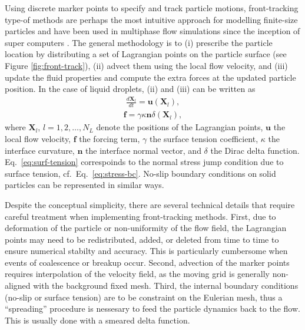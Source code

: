 Using discrete marker points to specify and track particle motions, front-tracking type-of methods are perhaps the most intuitive approach for modelling finite-size particles and have been used in multiphase flow simulations since the inception of super computers \citep{Daly1969, Viecelli_1969, Peskin, Glimm_1982, unverdi_tryggvason_1992a, tryggvason_bunner_esmaeeli_juric_al-rawahi_tauber_han_nas_jan_2001a, Pozrikidis_JCP2001, Muradoglu_Tryggvason_2014}.
The general methodology is to
(i) prescribe the particle location by distributing a set of Lagrangian points on the particle surface (see Figure \ref{fig:front-track}),
(ii) advect them using the local flow velocity, and
(iii) update the fluid properties and compute the extra forces at the updated particle position.
In the case of liquid droplets, (ii) and (iii) can be written as
\begin{equation} \label{eq:lagrangian}
 \begin{aligned}
   \frac{d \bm{X}_l}{dt} = \bm{u}(\bm{X}_l),
 \end{aligned}
\end{equation}
\begin{equation} \label{eq:surf-tension}
 \begin{aligned}
   \bm{f} = \gamma \kappa \bm{n} \delta (\bm{X}_l) ,
 \end{aligned}
\end{equation}
where $\bm{X}_l$, $l=1,2,\dots,N_L$ denote the positions of the Lagrangian points, $\bm u$ the local flow velocity, $\bm f$ the forcing term, $\gamma$ the surface tension coefficient, $\kappa$ the interface curvature, $\bm n$ the interface normal vector, and $\delta$ the Dirac delta function. Eq.\ \eqref{eq:surf-tension} correspoinds to the normal stress jump condition due to surface tension, cf.\ Eq.\ \eqref{eq:stress-bc}. No-slip boundary conditions on solid particles can be represented in similar ways.

Despite the conceptual simplicity, there are several technical details that require careful treatment when implementing front-tracking methods.
First, due to deformation of the particle or non-uniformity of the flow field, the Lagrangian points may need to be redistributed, added, or deleted from time to time to ensure numerical stabilty and accuracy.
This is particularly cumbersome when events of coalescence or breakup occur.
Second, advection of the marker points requires interpolation of the velocity field, as the moving grid is generally non-aligned with the background fixed mesh.
Third, the internal boundary conditions (no-slip or surface tension) are to be constraint on the Eulerian mesh, thus a ``spreading'' procedure is nessesary to feed the particle dynamics back to the flow. This is usually done with a smeared delta function.

